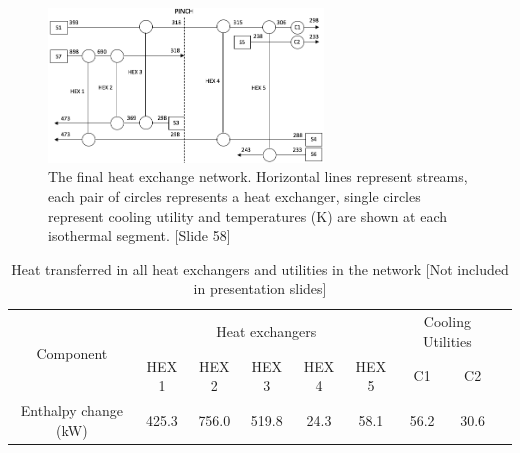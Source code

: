 \begin{figure} [H]
\centering
\includegraphics[width=0.65\textwidth]{./pictures/heatexnetworkBIG.png}
  \caption{The final heat exchange network. Horizontal lines represent streams, each pair of circles represents a heat exchanger, single circles represent cooling utility and temperatures (K) are shown at each isothermal segment. [Slide 58]} \label{fig:heatexnetwork}
  \end{figure}

\begin {table} [h]
\begin{center}
\caption{Heat transferred in all heat exchangers and utilities in the network [Not included in presentation slides]} \label{tab:powerhex} 
\begin{tabular}{ |c|c|c|c|c|c|c|c|c| }
 \hline
\multirow{2}{*}{Component} & \multicolumn{5}{|c|}{Heat exchangers}& \multicolumn{2}{|c|}{Cooling Utilities}\\ 
 \cline{2-8}
   & HEX 1 & HEX 2 & HEX 3 & HEX 4 &HEX 5 & C1 & C2\\ 
 \hline
 Enthalpy change (kW) & 425.3 & 756.0 & 519.8 & 24.3 & 58.1 & 56.2 & 30.6\\ 
 \hline
\end{tabular}
\end{center}  
\end {table}

%